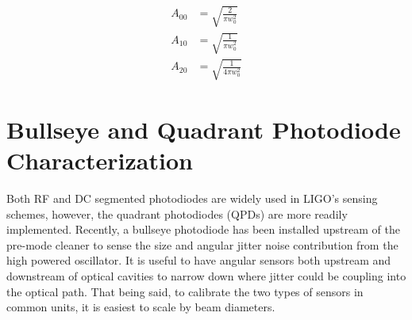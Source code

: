 \begin{appendices}
	\begin{equation}
	\begin{aligned}
		A_{00} &	= \sqrt{\frac{2}{\pi w_0^2}}
	\\	A_{10} &	= \sqrt{\frac{1}{\pi w_0^2}}
	\\	A_{20} &	= \sqrt{\frac{1}{4\pi w_0^2}}
	\end{aligned}
	\end{equation}
	
	\chapter{Bullseye and Quadrant Photodiode Characterization}\label{BPDchar}
	Both RF and DC segmented photodiodes are widely used in LIGO's sensing schemes, however, the quadrant photodiodes (QPDs) are more readily implemented.  Recently, a bullseye photodiode has been installed upstream of the pre-mode cleaner to sense the size and angular jitter noise contribution from the high powered oscillator.  It is useful to have angular sensors both upstream and downstream of optical cavities to narrow down where jitter could be coupling into the optical path.  That being said, to calibrate the two types of sensors in common units, it is easiest to scale by beam diameters.

\end{appendices}
